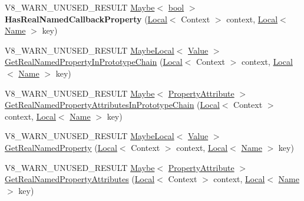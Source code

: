 \begin{DoxyCompactItemize}
\item 
\mbox{\label{classv8_1_1Object_a97809eef1662ad04dcdac35344c5a05d}} 
V8\+\_\+\+W\+A\+R\+N\+\_\+\+U\+N\+U\+S\+E\+D\+\_\+\+R\+E\+S\+U\+LT \mbox{\hyperlink{classv8_1_1Maybe}{Maybe}}$<$ \mbox{\hyperlink{classbool}{bool}} $>$ {\bfseries Has\+Real\+Named\+Callback\+Property} (\mbox{\hyperlink{classv8_1_1Local}{Local}}$<$ Context $>$ context, \mbox{\hyperlink{classv8_1_1Local}{Local}}$<$ \mbox{\hyperlink{classv8_1_1Name}{Name}} $>$ key)
\item 
V8\+\_\+\+W\+A\+R\+N\+\_\+\+U\+N\+U\+S\+E\+D\+\_\+\+R\+E\+S\+U\+LT \mbox{\hyperlink{classv8_1_1MaybeLocal}{Maybe\+Local}}$<$ \mbox{\hyperlink{classv8_1_1Value}{Value}} $>$ \mbox{\hyperlink{classv8_1_1Object_a48891efc7582cdd38a6d161203899e70}{Get\+Real\+Named\+Property\+In\+Prototype\+Chain}} (\mbox{\hyperlink{classv8_1_1Local}{Local}}$<$ Context $>$ context, \mbox{\hyperlink{classv8_1_1Local}{Local}}$<$ \mbox{\hyperlink{classv8_1_1Name}{Name}} $>$ key)
\item 
V8\+\_\+\+W\+A\+R\+N\+\_\+\+U\+N\+U\+S\+E\+D\+\_\+\+R\+E\+S\+U\+LT \mbox{\hyperlink{classv8_1_1Maybe}{Maybe}}$<$ \mbox{\hyperlink{namespacev8_a05f25f935e108a1ea2d150e274602b87}{Property\+Attribute}} $>$ \mbox{\hyperlink{classv8_1_1Object_a06a7dd82554ee4e82a6c54f7fff6b4bd}{Get\+Real\+Named\+Property\+Attributes\+In\+Prototype\+Chain}} (\mbox{\hyperlink{classv8_1_1Local}{Local}}$<$ Context $>$ context, \mbox{\hyperlink{classv8_1_1Local}{Local}}$<$ \mbox{\hyperlink{classv8_1_1Name}{Name}} $>$ key)
\item 
V8\+\_\+\+W\+A\+R\+N\+\_\+\+U\+N\+U\+S\+E\+D\+\_\+\+R\+E\+S\+U\+LT \mbox{\hyperlink{classv8_1_1MaybeLocal}{Maybe\+Local}}$<$ \mbox{\hyperlink{classv8_1_1Value}{Value}} $>$ \mbox{\hyperlink{classv8_1_1Object_a2b2061b69658173b3b7e39ee3ca1f394}{Get\+Real\+Named\+Property}} (\mbox{\hyperlink{classv8_1_1Local}{Local}}$<$ Context $>$ context, \mbox{\hyperlink{classv8_1_1Local}{Local}}$<$ \mbox{\hyperlink{classv8_1_1Name}{Name}} $>$ key)
\item 
V8\+\_\+\+W\+A\+R\+N\+\_\+\+U\+N\+U\+S\+E\+D\+\_\+\+R\+E\+S\+U\+LT \mbox{\hyperlink{classv8_1_1Maybe}{Maybe}}$<$ \mbox{\hyperlink{namespacev8_a05f25f935e108a1ea2d150e274602b87}{Property\+Attribute}} $>$ \mbox{\hyperlink{classv8_1_1Object_aa928085fd056cf4864b3860dbd31472e}{Get\+Real\+Named\+Property\+Attributes}} (\mbox{\hyperlink{classv8_1_1Local}{Local}}$<$ Context $>$ context, \mbox{\hyperlink{classv8_1_1Local}{Local}}$<$ \mbox{\hyperlink{classv8_1_1Name}{Name}} $>$ key)

\end{DoxyCompactItemize}
